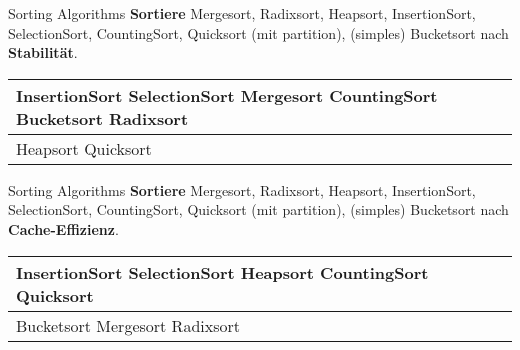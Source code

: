 \begin{frame}{Sorting Algorithms}
	\textbf{Sortiere} Mergesort, Radixsort, Heapsort, InsertionSort, SelectionSort, CountingSort, Quicksort {\small (mit partition)}, (simples) Bucketsort nach \textbf{Stabilität}. \\ \pause
	\forcenewline
	\centering
	\begin{tabular}{m{.3\linewidth} | m{.2\linewidth} |}
		\hline
		InsertionSort \newline 
		SelectionSort \newline
		Mergesort \newline
		CountingSort \newline
		Bucketsort \newline
		Radixsort & \YesCell \\
		\hline
		Heapsort \newline
		Quicksort & \NoCell \\
		\hline
	\end{tabular}
\end{frame}

\begin{frame}{Sorting Algorithms}
	\textbf{Sortiere} Mergesort, Radixsort, Heapsort, InsertionSort, SelectionSort, CountingSort, Quicksort {\small (mit partition)}, (simples) Bucketsort nach \textbf{Cache-Effizienz}. \\ \pause
	\forcenewline
	\centering
	\begin{tabular}{m{.3\linewidth} | m{.2\linewidth} |}
		\hline
		InsertionSort \newline 
		SelectionSort \newline
		Heapsort \newline
		CountingSort \newline
		Quicksort & \YesCell \\
		\hline
		Bucketsort \newline
		Mergesort \newline
		Radixsort & \NoCell \\
		\hline
	\end{tabular}
\end{frame}

